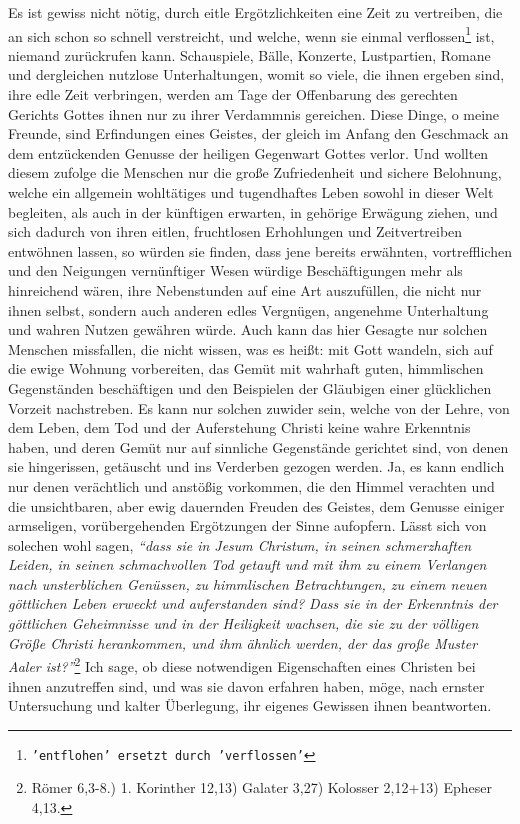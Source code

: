 Es ist gewiss nicht nötig, durch eitle Ergötzlichkeiten eine Zeit zu vertreiben,
die an sich schon so schnell verstreicht, und welche, wenn sie einmal
verflossen\footnote{\texttt{'entflohen' ersetzt
durch 'verflossen'}}
ist, niemand zurückrufen kann. Schauspiele,
Bälle, Konzerte, Lustpartien, Romane
und dergleichen nutzlose Unterhaltungen, womit so viele, die ihnen ergeben sind,
ihre edle Zeit verbringen, werden am Tage der Offenbarung des gerechten Gerichts
Gottes ihnen nur zu ihrer Verdammnis
gereichen.
Diese Dinge, o meine Freunde,
sind Erfindungen eines Geistes, der gleich im Anfang den Geschmack an dem
entzückenden Genusse der heiligen Gegenwart Gottes verlor. Und wollten diesem
zufolge die Menschen nur die große Zufriedenheit und sichere Belohnung, welche
ein allgemein  wohltätiges und tugendhaftes Leben sowohl in
dieser Welt
begleiten, als auch in der künftigen erwarten, in gehörige Erwägung ziehen, und
sich dadurch von ihren eitlen, fruchtlosen Erhohlungen und Zeitvertreiben
entwöhnen lassen, so würden sie finden, dass jene bereits erwähnten,
vortrefflichen und den Neigungen vernünftiger Wesen würdige Beschäftigungen
mehr als hinreichend wären, ihre Nebenstunden auf eine Art auszufüllen, die
nicht nur ihnen selbst, sondern auch anderen edles Vergnügen, angenehme
Unterhaltung und wahren Nutzen gewähren würde. Auch kann das hier Gesagte nur
solchen Menschen missfallen, die nicht wissen, was es heißt: mit Gott wandeln,
sich auf die ewige Wohnung vorbereiten, das Gemüt mit
wahrhaft guten,
himmlischen Gegenständen beschäftigen und den Beispielen der Gläubigen einer
glücklichen Vorzeit nachstreben. Es kann nur solchen zuwider sein, welche von
der Lehre, von dem Leben, dem Tod und der Auferstehung
Christi keine
wahre
Erkenntnis haben, und deren Gemüt nur auf sinnliche Gegenstände gerichtet
sind, von denen sie hingerissen, getäuscht und ins Verderben
gezogen werden. Ja,
es kann endlich nur denen verächtlich und anstößig vorkommen, die den Himmel
verachten und die unsichtbaren, aber ewig dauernden Freuden des Geistes, dem
Genusse einiger armseligen, vorübergehenden Ergötzungen der Sinne aufopfern.
Lässt sich von solechen wohl sagen,
\textit{"`dass sie in Jesum Christum, in seinen
schmerzhaften Leiden, in seinen schmachvollen Tod getauft und mit ihm zu einem
Verlangen nach unsterblichen Genüssen, zu himmlischen Betrachtungen, zu einem
neuen göttlichen Leben erweckt und auferstanden sind? Dass sie in der
Erkenntnis der göttlichen Geheimnisse und in der Heiligkeit wachsen, die sie
zu der völligen Größe Christi herankommen, und ihm ähnlich werden, der das große
Muster Aaler ist?"'}\footnote{Römer 6,3-8.) 1. Korinther 12,13) Galater 3,27)
Kolosser 2,12+13)
Epheser 4,13.}
Ich sage, ob diese notwendigen Eigenschaften eines Christen bei
ihnen anzutreffen sind, und was sie davon erfahren haben, möge, nach ernster
Untersuchung und kalter Überlegung, ihr eigenes Gewissen ihnen beantworten.

